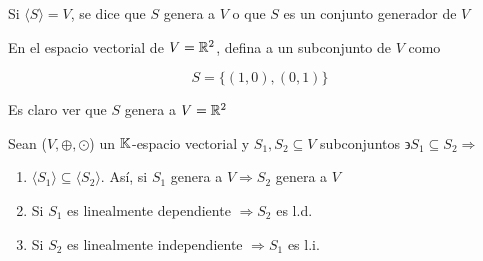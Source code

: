 \begin{definition}
    Si $\langle  S \rangle = V$, se dice que $S$ genera a $V$ o que $S$ es un conjunto generador de $V$
\end{definition}

\begin{eg}
    En el espacio vectorial de $V= \mathbb{R}^2$, defina a un subconjunto de $V$ como

    \begin{equation*}
        S= \{ (1,0), (0,1) \}
    \end{equation*}

    Es claro ver que $S$ genera a $V=\mathbb{R}^2$
\end{eg}

\begin{theorem} \label{theom111}
    Sean ($V, \oplus, \odot$) un $\mathbb{K}$-espacio vectorial y $S_1, S_2 \subseteq V$ subconjuntos $\backepsilon S_1 \subseteq S_2 \Rightarrow$

    \begin{enumerate}
        \item $\langle  S_1 \rangle \subseteq \langle  S_2 \rangle$. Así, si $S_1$ genera a $V \Rightarrow S_2$ genera a $V$
        \item Si $S_1$ es linealmente dependiente $\Rightarrow S_2$ es l.d.
        \item Si $S_2$ es linealmente independiente $\Rightarrow S_1$ es l.i.
    \end{enumerate}
\end{theorem}

